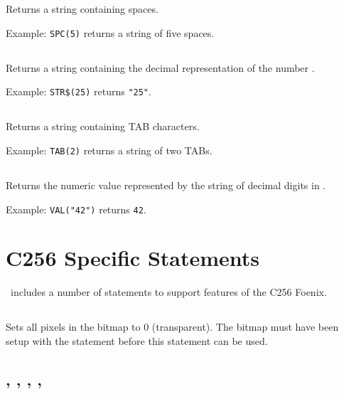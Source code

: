 \documentclass{report}
\begin{document}
    Returns a string containing  spaces.
    
    Example: \verb+SPC(5)+ returns a string of five spaces.

    \subsection*{}

    Returns a string containing the decimal representation of the number .
    
    Example: \verb+STR$(25)+ returns \verb+"25"+.

    \subsection*{}

    Returns a string containing  TAB characters.
    
    Example: \verb+TAB(2)+ returns a string of two TABs.

    \subsection*{}

    Returns the numeric value represented by the string of decimal digits in .
    
    Example: \verb+VAL("42")+ returns \verb+42+.

    \section*{C256 Specific Statements}

    \BASIC\ includes a number of statements to support features of the C256 Foenix.

    \subsection*{}

    Sets all pixels in the bitmap to 0 (transparent).
    The bitmap must have been setup with the  statement before
    this statement can be used.

    \subsection*{ , , , , }
\end{document}
